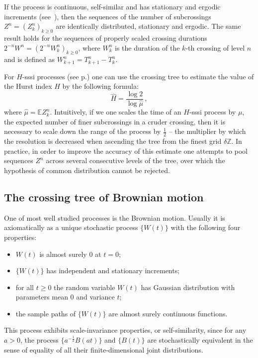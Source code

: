 \documentclass[a4paper]{article}
\newcommand{\ex}{\mathbb{E}}
\begin{document}
If the process is continuous, self-similar and has stationary and ergodic increments
(see~\cite{jonesshen2005}), then the sequences of the number of subcrossings $Z^n = (Z_k^n)_{k\geq 0}$
are identically distributed, stationary and ergodic. The same result holds for
the sequences of properly scaled crossing durations $2^{-n} W^n = (2^{-n} W_k^n)_{k\geq0}$,
where $W_k^n$ is the duration of the $k$-th crossing of level $n$ and is defined
as $W_{k+1}^n = T_{k+1}^n - T_k^n$.

For $H$-sssi processes (see p.\pageref{def:hsssi}) one can use the crossing tree
to estimate the value of the Hurst index $H$ by the following formula:
\[ \hat{H} = \frac{\log 2}{\log \hat{\mu}} \,,\]
where $\hat{\mu} = \ex Z_k^n$. Intuitively, if we one scales the time of an $H$-sssi
process by $\mu$, the expected number of finer subcrossings in a cruder crossing,
then it is necessary to scale down the range of the process by $\tfrac{1}{2}$ --
the multiplier by which the resolution is decreased when ascending the tree from
the finest grid $\delta \mathbb{Z}$. In practice, in order to improve the accuracy of
this estimate one attempts to pool sequences $Z^n$ across several consecutive levels
of the tree, over which the hypothesis of common distribution cannot be rejected.


\subsection{The crossing tree of Brownian motion} %
\label{sub:the_crossing_tree_of_brownian_motion}

One of most well studied processes is the Brownian motion. Usually it is axiomatically
as a unique stochastic process $\bigl\{W(t)\bigr\}$ with the following four properties:
\begin{itemize}
    \item $W(t)$ is almost surely $0$ at $t=0$;
    \item $\{W(t)\}$ has independent and stationary increments;
    \item for all $t\geq 0$ the random variable $W(t)$ has Gaussian distribution with
    parameters mean $0$ and variance $t$;
    \item the sample paths of $\{W(t)\}$ are almost surely continuous functions.
\end{itemize}
This process exhibits scale-invariance properties, or self-similarity, since for any
$a>0$, the process $\bigl\{a^{-\tfrac{1}{2}} B(at)\bigr\}$ and $\{B(t)\}$ are stochastically
equivalent in the sense of equality of all their finite-dimensional joint distributions.
\end{document}
